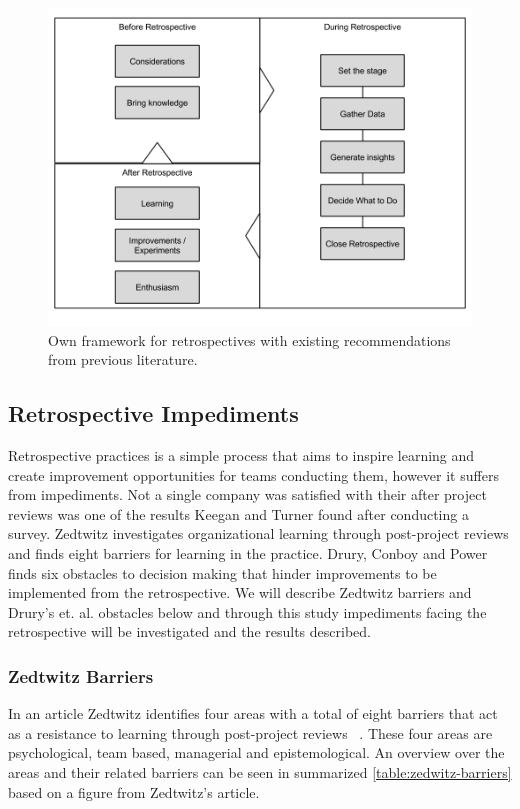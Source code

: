 \begin{figure}[!h]
	\centering
	\includegraphics[width=\textwidth, keepaspectratio]{figures/retro-basis.png}
	\caption{Own framework for retrospectives with existing recommendations from previous literature.}
	\label{figure:retro-basis}
\end{figure}

\subsection{Retrospective Impediments}
Retrospective practices is a simple process that aims to inspire learning and create improvement opportunities for teams conducting them, however it suffers from impediments. Not a single company was satisfied with their after project reviews was one of the results Keegan and Turner \cite{Keegan2000} found after conducting a survey. Zedtwitz investigates organizational learning through post-project reviews and finds eight barriers for learning in the practice. Drury, Conboy and Power \cite{Drury2012} finds six obstacles to decision making that hinder improvements to be implemented from the retrospective. We will describe Zedtwitz barriers and Drury's et. al. obstacles below and through this study impediments facing the retrospective will be investigated and the results described. 

\subsubsection{Zedtwitz Barriers}
In an article Zedtwitz identifies four areas with a total of eight barriers that act as a resistance to learning through post-project reviews ~\cite{Zedtwitz2002}. These four areas are psychological, team based, managerial and epistemological. An overview over the areas and their related barriers can be seen in summarized \autoref{table:zedwitz-barriers} based on a figure from Zedtwitz's article. 

